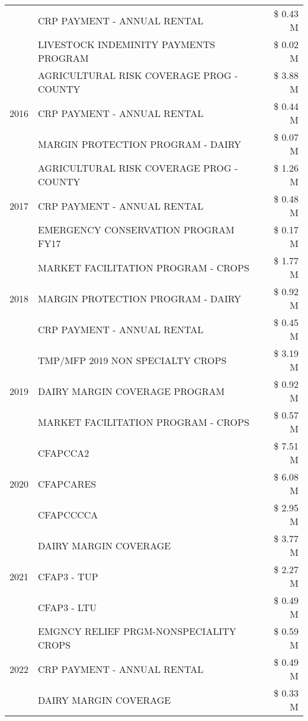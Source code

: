 \begin{tabular}{llr}
 & CRP PAYMENT - ANNUAL RENTAL & \$ 0.43 M \\
 & LIVESTOCK INDEMINITY PAYMENTS PROGRAM & \$ 0.02 M \\
\cline{1-3}
\multirow[t]{3}{*}{2016} & AGRICULTURAL RISK COVERAGE PROG - COUNTY & \$ 3.88 M \\
 & CRP PAYMENT - ANNUAL RENTAL & \$ 0.44 M \\
 & MARGIN PROTECTION PROGRAM - DAIRY & \$ 0.07 M \\
\cline{1-3}
\multirow[t]{3}{*}{2017} & AGRICULTURAL RISK COVERAGE PROG - COUNTY & \$ 1.26 M \\
 & CRP PAYMENT - ANNUAL RENTAL & \$ 0.48 M \\
 & EMERGENCY CONSERVATION PROGRAM FY17 & \$ 0.17 M \\
\cline{1-3}
\multirow[t]{3}{*}{2018} & MARKET FACILITATION PROGRAM - CROPS & \$ 1.77 M \\
 & MARGIN PROTECTION PROGRAM - DAIRY & \$ 0.92 M \\
 & CRP PAYMENT - ANNUAL RENTAL & \$ 0.45 M \\
\cline{1-3}
\multirow[t]{3}{*}{2019} & TMP/MFP 2019 NON SPECIALTY CROPS & \$ 3.19 M \\
 & DAIRY MARGIN COVERAGE PROGRAM & \$ 0.92 M \\
 & MARKET FACILITATION PROGRAM - CROPS & \$ 0.57 M \\
\cline{1-3}
\multirow[t]{3}{*}{2020} & CFAPCCA2 & \$ 7.51 M \\
 & CFAPCARES & \$ 6.08 M \\
 & CFAPCCCCA & \$ 2.95 M \\
\cline{1-3}
\multirow[t]{3}{*}{2021} & DAIRY MARGIN COVERAGE & \$ 3.77 M \\
 & CFAP3 - TUP & \$ 2.27 M \\
 & CFAP3 - LTU & \$ 0.49 M \\
\cline{1-3}
\multirow[t]{3}{*}{2022} & EMGNCY RELIEF PRGM-NONSPECIALITY CROPS & \$ 0.59 M \\
 & CRP PAYMENT - ANNUAL RENTAL & \$ 0.49 M \\
 & DAIRY MARGIN COVERAGE & \$ 0.33 M \\
\cline{1-3}
\bottomrule
\end{tabular}
